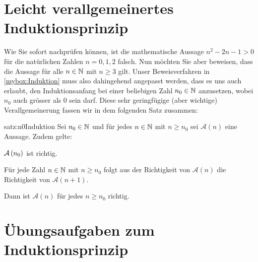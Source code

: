 \clearpage
\section{Leicht verallgemeinertes Induktionsprinzip}
Wie Sie sofort nachprüfen können, ist die mathematische Aussage $n^2 - 2n - 1 > 0$ für die natürlichen Zahlen $n = 0, 1, 2$ falsch. Nun möchten Sie aber beweisen, dass die Aussage für alle $n\in\mathbb{N}$ mit $n\geq 3$ gilt. Unser Beweisverfahren in \cref{mybox:Induktion} muss also dahingehend angepasst werden, dass es uns auch erlaubt, den Induktionsanfang bei einer beliebigen Zahl $n_0\in\mathbb{N}$ anzusetzen, wobei $n_0$ auch grösser als $0$ sein darf. Diese sehr geringfügige (aber wichtige) Verallgemeinerung fassen wir in dem folgenden Satz zusammen:
\begin{satz}{satz:n0Induktion}
Sei $n_0\in\mathbb{N}$ und für jedes $n\in\mathbb{N}$ mit $n\geq n_0$ sei $\mathcal{A}(n)$ eine Aussage. Zudem gelte:
\begin{renum}
    \item $\mathcal{A}\left(n_0\right)$ ist richtig.
    \item Für jede Zahl $n\in\mathbb{N}$ mit $n\geq n_0$ folgt aus der Richtigkeit von $\mathcal{A}(n)$ die Richtigkeit von $\mathcal{A}(n+1)$.
\end{renum}
Dann ist $\mathcal{A}(n)$ für jedes $n\geq n_0$ richtig.
\end{satz}


\section{Übungsaufgaben zum Induktionsprinzip}

